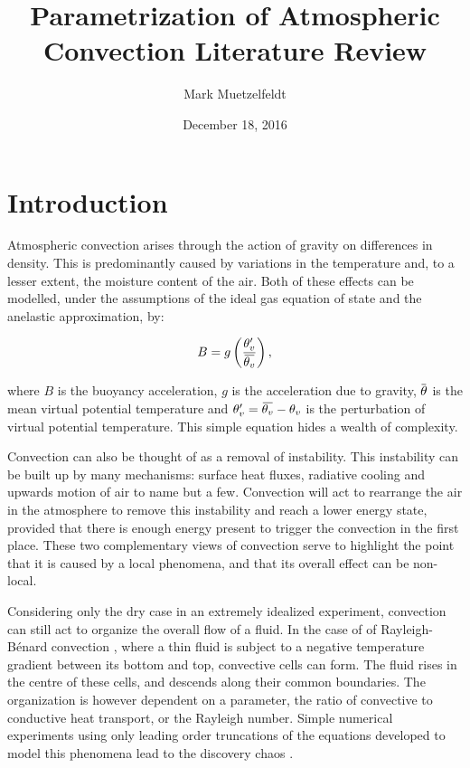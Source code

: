 \documentclass[11pt,a4paper]{article}
\title{Parametrization of Atmospheric Convection Literature Review}
\date{December 18, 2016}
\author{Mark Muetzelfeldt}
\newcommand{\overbar}[1]{\mkern 1.5mu\overline{\mkern-1.5mu#1\mkern-1.5mu}\mkern 1.5mu}
\begin{document}
\maketitle

\section{Introduction}
\label{sec:introduction}


Atmospheric convection arises through the action of gravity on differences in density. This is predominantly caused by variations in the temperature and, to a lesser extent, the moisture content of the air. Both of these effects can be modelled, under the assumptions of the ideal gas equation of state and the anelastic approximation, by:

\begin{equation}
    B = g \left(\frac{\theta_v'}{\overbar{\theta_v}}\right),
\end{equation}

\noindent
where $B$ is the buoyancy acceleration, $g$ is the acceleration due to gravity, $\overbar{\theta}$ is the mean virtual potential temperature and $\theta_v' = \overbar{\theta_v} - \theta_v$ is the perturbation of virtual potential temperature. This simple equation hides a wealth of complexity. 

Convection can also be thought of as a removal of instability. This instability can be built up by many mechanisms: surface heat fluxes, radiative cooling and upwards motion of air to name but a few. Convection will act to rearrange the air in the atmosphere to remove this instability and reach a lower energy state, provided that there is enough energy present to trigger the convection in the first place. These two complementary views of convection serve to highlight the point that it is caused by a local phenomena, and that its overall effect can be non-local.

Considering only the dry case in an extremely idealized experiment, convection can still act to organize the overall flow of a fluid. In the case of of Rayleigh-B\'{e}nard convection \parencite{rayleigh1916lix}, where a thin fluid is subject to a negative temperature gradient between its bottom and top, convective cells can form. The fluid rises in the centre of these cells, and descends along their common boundaries. The organization is however dependent on a parameter, the ratio of convective to conductive heat transport, or the Rayleigh number. Simple numerical experiments using only leading order truncations of the equations developed to model this phenomena lead to the discovery chaos \parencite{lorenz1963deterministic}.
\end{document}
